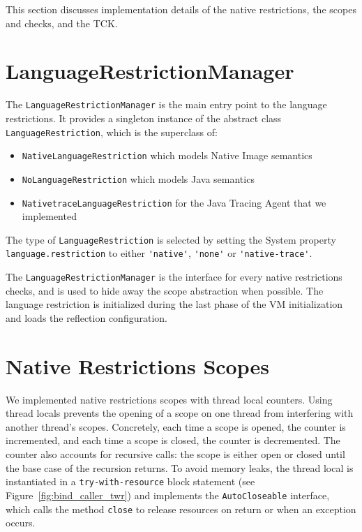 This section discusses implementation details of the native restrictions, the scopes and checks, and the TCK.

\section{LanguageRestrictionManager}
The \verb|LanguageRestrictionManager| is the main entry point to the language restrictions. It provides a singleton instance of the abstract class \verb|LanguageRestriction|, which is the superclass of: 
\begin{itemize}
    \item \texttt{NativeLanguageRestriction} which models Native Image semantics
    \item \texttt{NoLanguageRestriction} which  models Java semantics
    \item \texttt{NativetraceLanguageRestriction} for the Java Tracing Agent that we implemented
\end{itemize}
The type of \verb|LanguageRestriction| is selected by setting the System property \verb|language.restriction| to either \verb|'native'|, \verb|'none'| or \verb|'native-trace'|. 

The \verb|LanguageRestrictionManager| is the interface for every native restrictions checks, and is used to hide away the scope abstraction when possible.
The language restriction is initialized during the last phase of the VM initialization and loads the reflection configuration.
\section{Native Restrictions Scopes}
We implemented native restrictions scopes with thread local counters. Using thread locals prevents the opening of a scope on one thread from interfering with another thread's scopes.
Concretely, each time a scope is opened, the counter is incremented, and each time a scope is closed, the counter is decremented. The counter also accounts for recursive calls: the scope is either open or closed until the base case of the recursion returns.
To avoid memory leaks, the thread local is instantiated in a \verb|try-with-resource| block statement (see Figure~\ref{fig:bind_caller_twr}) and implements the \verb|AutoCloseable| interface, which calls the method \verb|close| to release resources on return or when an exception occurs.

